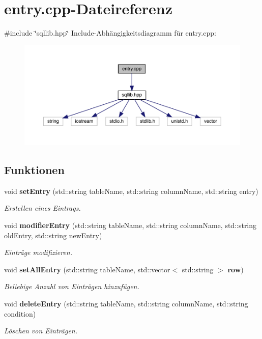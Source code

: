 \section{entry.\+cpp-\/\+Dateireferenz}
\label{entry_8cpp}
{\ttfamily \#include \char`\"{}sqllib.\+hpp\char`\"{}}\newline
Include-\/\+Abhängigkeitsdiagramm für entry.\+cpp\+:\nopagebreak
\begin{figure}[H]
\begin{center}
\leavevmode
\includegraphics[width=350pt]{entry_8cpp__incl}
\end{center}
\end{figure}
\subsection*{Funktionen}
\begin{DoxyCompactItemize}
\item 
void \textbf{ set\+Entry} (std\+::string table\+Name, std\+::string column\+Name, std\+::string entry)
\begin{DoxyCompactList}\small\item\em Erstellen eines Eintrags. \end{DoxyCompactList}\item 
void \textbf{ modifier\+Entry} (std\+::string table\+Name, std\+::string column\+Name, std\+::string old\+Entry, std\+::string new\+Entry)
\begin{DoxyCompactList}\small\item\em Einträge modifizieren. \end{DoxyCompactList}\item 
void \textbf{ set\+All\+Entry} (std\+::string table\+Name, std\+::vector$<$ std\+::string $>$ \textbf{ row})
\begin{DoxyCompactList}\small\item\em Beliebige Anzahl von Einträgen hinzufügen. \end{DoxyCompactList}\item 
void \textbf{ delete\+Entry} (std\+::string table\+Name, std\+::string column\+Name, std\+::string condition)
\begin{DoxyCompactList}\small\item\em Löschen von Einträgen. \end{DoxyCompactList}\end{DoxyCompactItemize}



